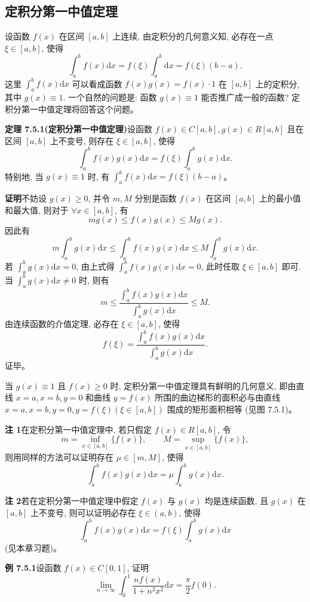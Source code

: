 \documentclass[UTF8, 12pt, fontset=fandol, oneside]{ctexart}
\begin{document}
\subsection{定积分第一中值定理}

设函数 $f(x)$ 在区间 $[a,b]$ 上连续, 由定积分的几何意义知, 必存在一点 $\xi\in[a,b]$, 使得
\[
  \int_a^b f(x)\mathrm dx=f(\xi)\int_a^b\mathrm dx=f(\xi)(b-a).
\]
这里 $\int_a^b f(x)\mathrm dx$ 可以看成函数 $f(x)g(x)=f(x)\cdot1$ 在 $[a,b]$ 上的定积分, 其中 $g(x)\equiv1$. 一个自然的问题是: 函数 $g(x)\equiv1$ 能否推广成一般的函数? 定积分第一中值定理将回答这个问题。

\noindent\textbf{定理 7.5.1(定积分第一中值定理)}\quad 设函数 $f(x)\in C[a,b],g(x)\in R[a,b]$ 且在区间 $[a,b]$ 上不变号, 则存在 $\xi\in[a,b]$, 使得
\[
  \int_a^b f(x)g(x)\mathrm dx=f(\xi)\int_a^b g(x)\mathrm dx.
\]
特别地, 当 $g(x)\equiv1$ 时, 有 $\int_a^b f(x)\mathrm dx=f(\xi)(b-a)$。

\noindent\textbf{证明}\quad 不妨设 $g(x)\geq0$, 并令 $m,M$ 分别是函数 $f(x)$ 在区间 $[a,b]$ 上的最小值和最大值, 则对于 $\forall x\in[a,b]$, 有
\[
  mg(x)\leq f(x)g(x)\leq Mg(x).
\]
因此有
\[
  m\int_a^b g(x)\mathrm dx
  \leq\int_a^b f(x)g(x)\mathrm dx
  \leq M\int_a^b g(x)\mathrm dx.
\]
若 $\int_a^b g(x)\mathrm dx=0$, 由上式得 $\int_a^b f(x)g(x)\mathrm dx=0$, 此时任取 $\xi\in[a,b]$ 即可. 当 $\int_a^b g(x)\mathrm dx\neq0$ 时, 则有
\[
  m\leq
  \frac{\int_a^b f(x)g(x)\mathrm dx}{\int_a^b g(x)\mathrm dx}
  \leq M.
\]
由连续函数的介值定理, 必存在 $\xi\in[a,b]$, 使得
\[
  f(\xi)=
  \frac{\int_a^b f(x)g(x)\mathrm dx}{\int_a^b g(x)\mathrm dx}.
\]
证毕。

当 $g(x)\equiv1$ 且 $f(x)\geq0$ 时, 定积分第一中值定理具有鲜明的几何意义, 即由直线 $x=a,x=b,y=0$ 和曲线 $y=f(x)$ 所围的曲边梯形的面积必与由直线 $x=a,x=b,y=0,y=f(\xi)(\xi\in[a,b])$ 围成的矩形面积相等 (见图 7.5.1)。

\noindent\textbf{注 1}\quad 在定积分第一中值定理中, 若只假定 $f(x)\in R[a,b]$, 令
\[
  m=\inf_{x\in[a,b]}\{f(x)\},\qquad
  M=\sup_{x\in[a,b]}\{f(x)\},
\]
则用同样的方法可以证明存在 $\mu\in[m,M]$, 使得
\[
  \int_a^b f(x)g(x)\mathrm dx=\mu\int_a^b g(x)\mathrm dx.
\]

\noindent\textbf{注 2}\quad 若在定积分第一中值定理中假定 $f(x)$ 与 $g(x)$ 均是连续函数, 且 $g(x)$ 在 $[a,b]$ 上不变号, 则可以证明必存在 $\xi\in(a,b)$, 使得
\[
  \int_a^b f(x)g(x)\mathrm dx=f(\xi)\int_a^b g(x)\mathrm dx
\]
(见本章习题)。

\noindent\textbf{例 7.5.1}\quad 设函数 $f(x)\in C[0,1]$, 证明
\[
  \lim_{n\to\infty}\int_0^1\frac{nf(x)}{1+n^2x^2}\mathrm dx=\frac{\pi}{2}f(0).
\]
\end{document}
